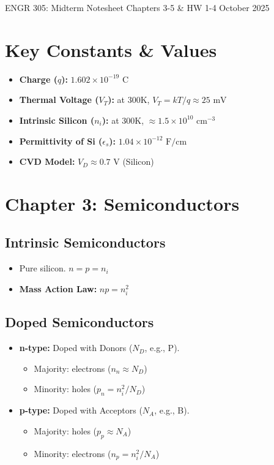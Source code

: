 \documentclass[10pt]{article}
\begin{document}
ENGR 305: Midterm Notesheet \hfill Chapters 3-5 \& HW 1-4 \hfill October 2025

\begin{multicols*}{2}
\section*{Key Constants \& Values}
\begin{itemize}\itemsep0pt
    \item \textbf{Charge ($q$):} $1.602 \times 10^{-19} \text{ C}$
    \item \textbf{Thermal Voltage ($V_T$):} at 300K, $V_T = kT/q \approx 25 \text{ mV}$
    \item \textbf{Intrinsic Silicon ($n_i$):} at 300K, $\approx 1.5 \times 10^{10} \text{ cm}^{-3}$
    \item \textbf{Permittivity of Si ($\epsilon_s$):} $1.04 \times 10^{-12} \text{ F/cm}$
    \item \textbf{CVD Model:} $V_D \approx 0.7 \text{ V}$ (Silicon)
\end{itemize}

\section{Chapter 3: Semiconductors}

\subsection*{Intrinsic Semiconductors}
\begin{itemize}\itemsep0pt
    \item Pure silicon. $n = p = n_i$
    \item \textbf{Mass Action Law:} $np = n_i^2$
\end{itemize}

\subsection*{Doped Semiconductors}
\begin{itemize}\itemsep0pt
    \item \textbf{n-type:} Doped with Donors ($N_D$, e.g., P).
    \begin{itemize}\itemsep0pt
        \item Majority: electrons ($n_n \approx N_D$)
        \item Minority: holes ($p_n = n_i^2 / N_D$)
    \end{itemize}
    \item \textbf{p-type:} Doped with Acceptors ($N_A$, e.g., B).
    \begin{itemize}\itemsep0pt
        \item Majority: holes ($p_p \approx N_A$)
        \item Minority: electrons ($n_p = n_i^2 / N_A$)
    \end{itemize}
\end{itemize}


\end{multicols*}
\end{document}
